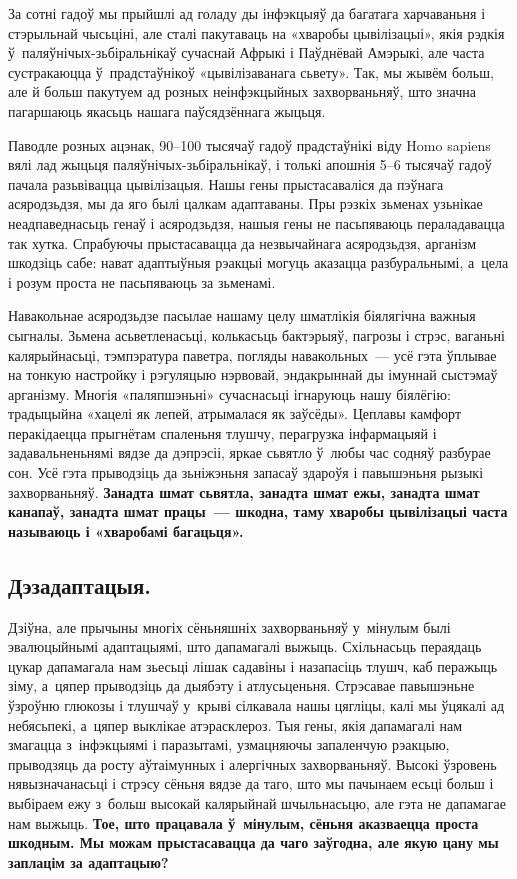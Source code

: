 За сотні гадоў мы прыйшлі ад голаду ды інфэкцыяў да багатага харчаваньня і стэрыльнай чысьціні, але сталі пакутаваць на «хваробы цывілізацыі», якія рэдкія ў~паляўнічых-зьбіральнікаў сучаснай Афрыкі і Паўднёвай Амэрыкі, але часта сустракаюцца ў~прадстаўнікоў «цывілізаванага сьвету». Так, мы жывём больш, але й больш пакутуем ад розных неінфэкцыйных захворваньняў, што значна пагаршаюць якасьць нашага паўсядзённага жыцьця.

Паводле розных ацэнак, 90--100 тысячаў гадоў прадстаўнікі віду Homo sapiens вялі лад жыцьця паляўнічых-зьбіральнікаў, і толькі апошнія 5--6 тысячаў гадоў пачала разьвівацца цывілізацыя. Нашы гены прыстасаваліся да пэўнага асяродзьдзя, мы да яго былі цалкам адаптаваны. Пры рэзкіх зьменах узьнікае неадпаведнасьць генаў і асяродзьдзя, нашыя гены не пасьпяваюць пераладавацца так хутка. Спрабуючы прыстасавацца да незвычайнага асяродзьдзя, арганізм шкодзіць сабе: нават адаптыўныя рэакцыі могуць аказацца разбуральнымі, а~цела і розум проста не пасьпяваюць за зьменамі.

Навакольнае асяродзьдзе пасылае нашаму целу шматлікія біялягічна важныя сыгналы. Зьмена асьветленасьці, колькасьць бактэрыяў, пагрозы і стрэс, ваганьні калярыйнасьці, тэмпэратура паветра, погляды навакольных~--- усё гэта ўплывае на тонкую настройку і рэгуляцыю нэрвовай, эндакрыннай ды імуннай сыстэмаў арганізму. Многія «паляпшэньні» сучаснасьці ігнаруюць нашу біялёгію: традыцыйна «хацелі як лепей, атрымалася як заўсёды». Цеплавы камфорт перакідаецца прыгнётам спаленьня тлушчу, перагрузка інфармацыяй і задавальненьнямі вядзе да дэпрэсіі, яркае сьвятло ў~любы час содняў разбурае сон. Усё гэта прыводзіць да зьніжэньня запасаў здароўя і павышэньня рызыкі захворваньняў. \textbf{Занадта шмат сьвятла, занадта шмат ежы, занадта шмат канапаў, занадта шмат працы~--- шкодна, таму хваробы цывілізацыі часта называюць і «хваробамі багацьця».}

\subsection*{Дэзадаптацыя.}

Дзіўна, але прычыны многіх сёньняшніх захворваньняў у~мінулым былі эвалюцыйнымі адаптацыямі, што дапамагалі выжыць. Схільнасьць пераядаць цукар дапамагала нам зьесьці лішак садавіны і назапасіць тлушч, каб перажыць зіму, а~цяпер прыводзіць да дыябэту і атлусьценьня. Стрэсавае павышэньне ўзроўню глюкозы і тлушчаў у~крыві сілкавала нашы цягліцы, калі мы ўцякалі ад небясьпекі, а~цяпер выклікае атэрасклероз. Тыя гены, якія дапамагалі нам змагацца з~інфэкцыямі і паразытамі, узмацняючы запаленчую рэакцыю, прыводзяць да росту аўтаімунных і алергічных захворваньняў. Высокі ўзровень нявызначанасьці і стрэсу сёньня вядзе да таго, што мы пачынаем есьці больш і выбіраем ежу з~больш высокай калярыйнай шчыльнасьцю, але гэта не дапамагае нам выжыць. \textbf{Тое, што працавала ў~мінулым, сёньня аказваецца проста шкодным. Мы можам прыстасавацца да чаго заўгодна, але якую цану мы заплацім за адаптацыю?}

